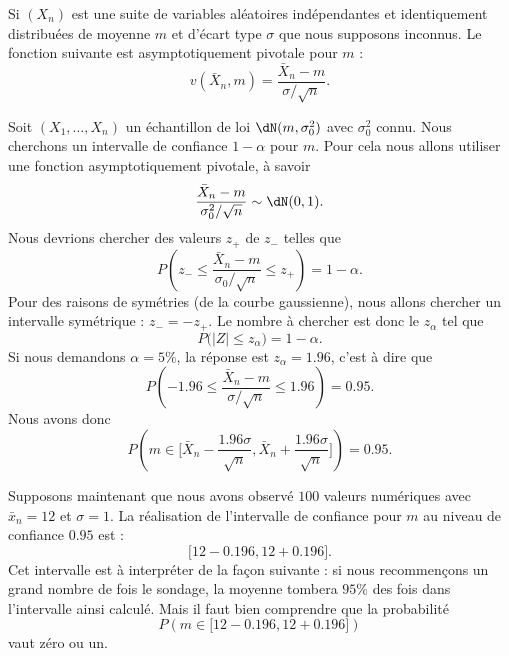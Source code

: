 \begin{example}
    Si \( (X_n)\) est une suite de variables aléatoires indépendantes et identiquement distribuées de moyenne \( m\) et d'écart type \( \sigma\) que nous supposons inconnus. Le fonction suivante est asymptotiquement pivotale pour \( m\) :
    \begin{equation}
        v(\bar X_n,m)=\frac{ \bar X_n-m }{ \sigma/\sqrt{n} }.
    \end{equation}
\end{example}

Soit \( (X_1,\ldots,X_n)\) un échantillon de loi \( \dN(m,\sigma_0^2)\) avec \( \sigma_0^2\) connu. Nous cherchons un intervalle de confiance \( 1-\alpha\) pour \( m\). Pour cela nous allons utiliser une fonction asymptotiquement pivotale, à savoir
\begin{equation}
    \frac{ \bar X_n-m }{ \sigma_0^2/\sqrt{n} }\sim\dN(0,1).
\end{equation}
Nous devrions chercher des valeurs \( z_+\) de \( z_-\) telles que
\begin{equation}
    P\left( z_-\leq \frac{ \bar X_n-m }{ \sigma_0/\sqrt{n} }\leq z_+ \right)=1-\alpha.
\end{equation}
Pour des raisons de symétries (de la courbe gaussienne), nous allons chercher un intervalle symétrique : \( z_-=-z_+\). Le nombre à chercher est donc le \( z_{\alpha}\) tel que 
\begin{equation}
    P\big( | Z |\leq z_{\alpha} \big)=1-\alpha.
\end{equation}
Si nous demandons \( \alpha=5\%\), la réponse est \( z_{\alpha}=1.96\), c'est à dire que
\begin{equation}
    P\left( -1.96\leq \frac{ \bar X_n-m }{ \sigma/\sqrt{n} }\leq 1.96 \right)=0.95.
\end{equation}
Nous avons donc
\begin{equation}
    P\left( m\in\big[ \bar X_n-\frac{ 1.96\sigma }{ \sqrt{n} },\bar X_n+\frac{ 1.96\sigma }{ \sqrt{n} } \big] \right)=0.95.
\end{equation}

Supposons maintenant que nous avons observé \( 100\) valeurs numériques avec \( \bar x_n=12\) et \( \sigma=1\). La réalisation de l'intervalle de confiance pour \( m\) au niveau de confiance \( 0.95\) est :
\begin{equation}
    \big[ 12-0.196,12+0.196 \big].
\end{equation}
Cet intervalle est à interpréter de la façon suivante : si nous recommençons un grand nombre de fois le sondage, la moyenne tombera \( 95\%\) des fois dans l'intervalle ainsi calculé. Mais il faut bien comprendre que la probabilité
\begin{equation}
    P\left( m\in\big[ 12-0.196,12+0.196 \big] \right)
\end{equation}
vaut zéro ou un.

